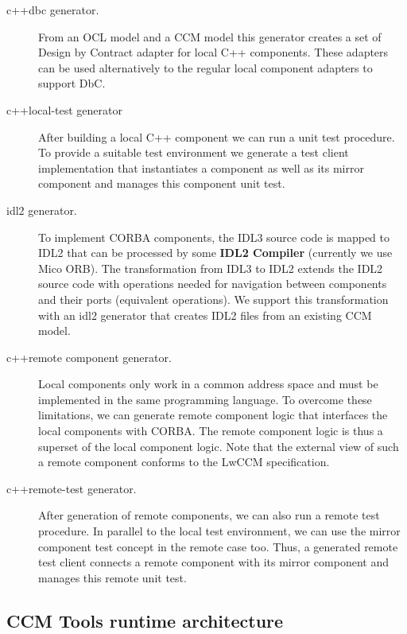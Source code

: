 \begin{description}
\item [c++dbc generator.]
From an OCL model and a CCM model this generator creates a set of
Design by Contract adapter for local C++ components.
These adapters can be used alternatively to the regular local component
adapters to support DbC.

\item [c++local-test generator]
After building a local C++ component we can run a unit test procedure. To
provide a suitable test environment we generate a test client implementation
that instantiates a component as well as its mirror component and manages this 
component unit test. 

\item [idl2 generator.]
To implement CORBA components, the IDL3 source code is mapped to IDL2 
that can be
processed by some {\bf IDL2 Compiler} (currently we use Mico ORB). The
transformation from IDL3 to IDL2 extends the IDL2 source code with 
operations needed for navigation between components and their ports (equivalent 
operations). 
We support this transformation with an idl2 generator that creates IDL2 files 
from an existing CCM model.

\item [c++remote component generator.]
Local components only work in a common address space and must be
implemented in the same programming language. To overcome these limitations, we
can generate remote component logic that interfaces the local components with 
CORBA.
The remote component logic is thus a superset of the local component logic. Note
that the external view of such a remote component conforms to the LwCCM
specification.

\item [c++remote-test generator.]
After generation of remote components, we can also run a remote test procedure.
In parallel to the local test environment, we can use the mirror component test 
concept in the remote case too.
Thus, a generated remote test client connects a remote component with its
mirror component and manages this remote unit test. 
\end{description}


\subsection{CCM Tools runtime architecture}

